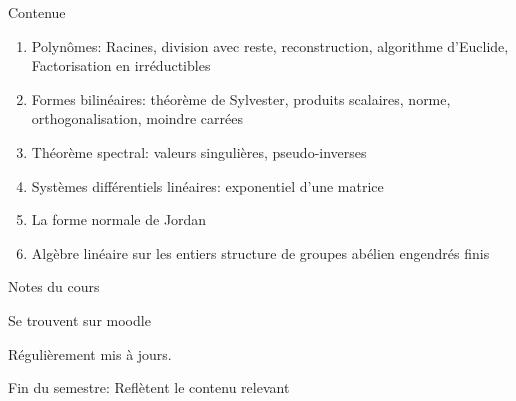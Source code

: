    \begin{frame}{Contenue}
   
     \begin{enumerate}
     \item Polynômes: {\small Racines, division avec reste,
         reconstruction, algorithme d'Euclide, Factorisation en
         irréductibles }
     \item  Formes bilinéaires: {\small théorème de Sylvester, produits scalaires, norme, orthogonalisation, moindre carrées }
     \item Théorème spectral: {\small  valeurs singulières, pseudo-inverses}
     \item Systèmes différentiels linéaires: {\small exponentiel d'une matrice}
     \item La forme normale de Jordan
     \item  Algèbre linéaire sur les entiers{ \small structure de groupes abélien  engendrés finis }
   \end{enumerate}

   \end{frame}

   \begin{frame}{Notes du cours}

     \bigskip 
     
     Se trouvent sur moodle

     \bigskip 
     {Régulièrement}  mis à jours.

     \bigskip 
     {Fin du semestre}: Reflètent le contenu  relevant  
   
     
   \end{frame}
   


